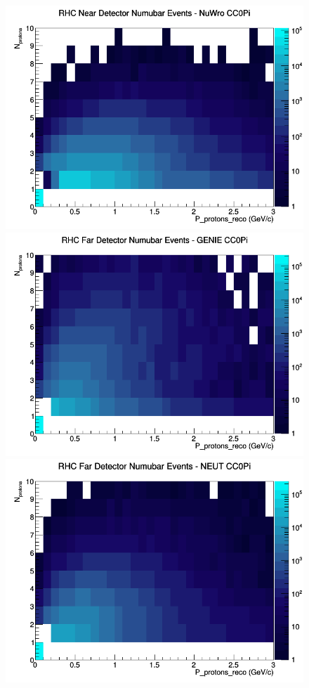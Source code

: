 \begin{figure}[h]
\includegraphics[width=\linewidth]{eff_N_P/FGT/protons/CC0Pi_RHC_ND_numubar_N_P_NuWro.png}
\endminipage
\newline
{}
\includegraphics[width=\linewidth]{eff_N_P/FGT/protons/CC0Pi_RHC_FD_numubar_N_P_GENIE.png}
\endminipage
{}
\includegraphics[width=\linewidth]{eff_N_P/FGT/protons/CC0Pi_RHC_FD_numubar_N_P_NEUT.png}

\end{figure}
